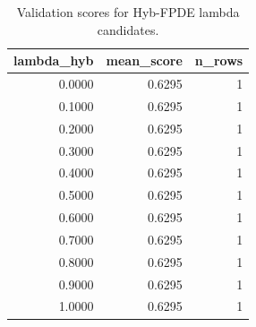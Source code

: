 \begin{table}[t]
\caption{Validation scores for Hyb-FPDE lambda candidates.}
\label{tab:lambda_distribution_computed}
\centering
\begin{tabular}{rrr}
\toprule
lambda\_hyb & mean\_score & n\_rows \\
\midrule
0.0000 & 0.6295 & 1 \\
0.1000 & 0.6295 & 1 \\
0.2000 & 0.6295 & 1 \\
0.3000 & 0.6295 & 1 \\
0.4000 & 0.6295 & 1 \\
0.5000 & 0.6295 & 1 \\
0.6000 & 0.6295 & 1 \\
0.7000 & 0.6295 & 1 \\
0.8000 & 0.6295 & 1 \\
0.9000 & 0.6295 & 1 \\
1.0000 & 0.6295 & 1 \\
\bottomrule
\end{tabular}

\end{table}
